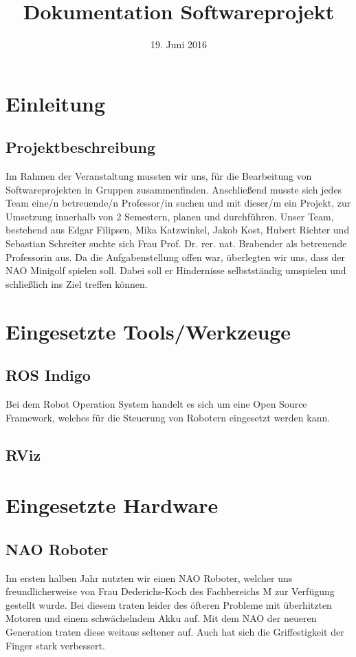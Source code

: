 \documentclass{scrartcl}
\title{Dokumentation Softwareprojekt}
\date{19. Juni 2016}
\begin{document}
\maketitle
\tableofcontents
\newpage

\section{Einleitung}


\subsection{Projektbeschreibung}

Im Rahmen der Veranstaltung mussten wir uns, für die Bearbeitung von Softwareprojekten in Gruppen zusammenfinden. Anschließend musste sich jedes Team eine/n betreuende/n Professor/in suchen und mit dieser/m ein Projekt, zur Umsetzung innerhalb von 2 Semestern, planen und durchführen. Unser Team, bestehend aus Edgar Filipsen, Mika Katzwinkel, Jakob Kost, Hubert Richter und Sebastian Schreiter suchte sich Frau Prof. Dr. rer. nat. Brabender als betreuende Professorin aus.
Da die Aufgabenstellung offen war, überlegten wir uns, dass der NAO Minigolf spielen soll. Dabei soll er Hindernisse selbstständig umspielen und schließlich ins Ziel treffen können.

\section{Eingesetzte Tools/Werkzeuge}

\subsection{ROS Indigo}
Bei dem Robot Operation System handelt es sich um eine Open Source Framework, welches für die Steuerung von Robotern eingesetzt werden kann. 
\subsection{RViz}

\section{Eingesetzte Hardware}

\subsection{NAO Roboter}
Im ersten halben Jahr nutzten wir einen NAO Roboter, welcher uns freundlicherweise von Frau Dederichs-Koch des Fachbereichs M zur Verfügung gestellt wurde. Bei diesem traten leider des öfteren Probleme mit überhitzten Motoren und einem schwächelndem Akku auf.  
Mit dem NAO der neueren Generation traten diese weitaus seltener auf. Auch hat sich die Griffestigkeit der Finger stark verbessert.
\end{document}
